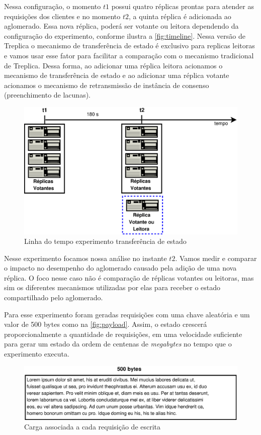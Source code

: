 Nessa configuração, o momento $t1$ possui quatro réplicas prontas para atender as
requisições dos clientes e no momento $t2$, a quinta réplica é adicionada ao aglomerado.
Essa nova réplica, poderá ser votante ou leitora dependendo da configuração do
experimento, conforme ilustra a \autoref{fig:timeline}. Nessa versão de Treplica o
mecanismo de transferência de estado é exclusivo para replicas leitoras e vamos usar esse
fator para facilitar a comparação com o mecanismo tradicional de Treplica. Dessa forma,
ao adicionar uma réplica leitora acionamos o mecanismo de transferência de estado e ao
adicionar uma réplica votante acionamos o mecanismo de retransmissão de instância de
consenso (preenchimento de lacunas).

\begin{figure}[ht]
  \centering
  \includegraphics[width=12cm]{conteudo/capitulos/figuras/timeline.eps}
  \caption{Linha do tempo experimento transferência de estado}
  \label{fig:timeline}
\end{figure}

Nesse experimento focamos nossa análise no instante $t2$. Vamos medir e comparar o impacto
no desempenho do aglomerado causado pela adição de uma nova réplica. O foco nesse caso não
é comparação de réplicas votantes ou leitoras, mas sim os diferentes mecanismos utilizadas
por elas para receber o estado compartilhado pelo aglomerado.

Para esse experimento foram geradas requisições com uma chave aleatória e um valor de 500
bytes como na \autoref{fig:payload}. Assim, o estado crescerá proporcionalmente a
quantidade de requisições, em uma velocidade suficiente para gerar um estado da ordem de
centenas de \emph{megabytes} no tempo que o experimento executa.

\begin{figure}[ht]
  \centering
  \includegraphics[width=12cm]{conteudo/capitulos/figuras/payload.dia.eps}
  \caption{Carga associada a cada requisição de escrita}
  \label{fig:payload}
\end{figure}

